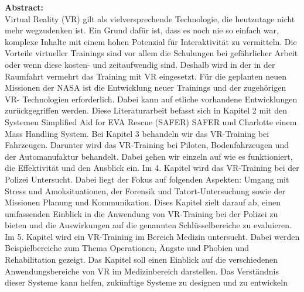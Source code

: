 {\small
\textbf{Abstract:}\\
Virtual Reality (VR) gilt als vielversprechende Technologie, die heutzutage nicht mehr
wegzudenken ist. Ein Grund dafür ist, dass es noch nie so einfach war, komplexe Inhalte mit
einem hohen Potenzial für Interaktivität zu vermitteln. Die Vorteile virtueller Trainings sind
vor allem die Schulungen bei gefährlicher Arbeit oder wenn diese kosten- und zeitaufwendig
sind. Deshalb wird in der in der Raumfahrt vermehrt das Training mit VR eingesetzt. Für die
geplanten neuen Missionen der NASA ist die Entwicklung neuer Trainings und der
zugehörigen VR- Technologien erforderlich. Dabei kann auf etliche vorhandene
Entwicklungen zurückgegriffen werden. Diese Literaturarbeit befasst sich in Kapitel 2 mit den Systemen
Simplified Aid for EVA Rescue (SAFER) SAFER und Charlotte einem Mass Handling
System.
Bei Kapitel 3 behandeln wir das VR-Training bei Fahrzeugen. Darunter wird das VR-Training bei Piloten, Bodenfahrzeugen und der Automanufaktur behandelt. Dabei gehen wir einzeln auf wie es funktioniert, die Effektivität und den Ausblick ein.
Im 4. Kapitel wird das VR-Training bei der Polizei Untersucht. Dabei liegt der Fokus auf folgenden Aspekten: Umgang mit Stress und Amoksituationen, der Forensik und Tatort-Untersuchung sowie der Missionen Planung und Kommunikation. Dises Kapitel zielt darauf ab, einen umfassenden Einblick in die Anwendung von VR-Training bei der Polizei zu bieten und die Auswirkungen auf
die genannten Schlüsselbereiche zu evaluieren.
Im 5. Kapitel wird ein VR-Training im Bereich Medizin untersucht. Dabei werden Beispielbereiche zum Thema Operationen, Ängste und Phobien und Rehabilitation gezeigt. Das Kapitel soll einen Einblick auf die verschiedenen Anwendungsbereiche von VR im Medizinbereich darstellen.
Das Verständnis dieser Systeme kann helfen, zukünftige Systeme zu designen und
zu entwickeln
}